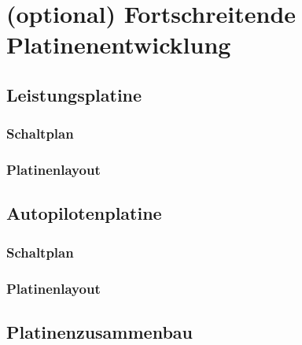\chapter{(optional) Fortschreitende Platinenentwicklung}\label{cha:Platinenentwicklung}

\section{Leistungsplatine}

\subsection{Schaltplan}

\subsection{Platinenlayout}

\section{Autopilotenplatine}

\subsection{Schaltplan}

\subsection{Platinenlayout}

\section{Platinenzusammenbau}
